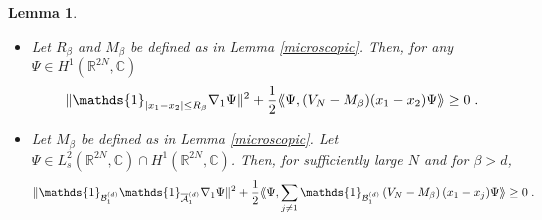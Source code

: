 \documentclass[11pt, english, american]{article}
\newcommand{\laa}{\langle\hspace{-0.08cm}\langle}
\newcommand{\raa}{\rangle\hspace{-0.08cm}\rangle}
\newtheorem{lemma}[theorem]{Lemma}
\begin{document}
\begin{lemma}\label{positiv V-w} 
$ $\\
\begin{itemize}
\item[(a)]
Let $R_\beta$ and $M_\beta$ be defined as in Lemma \ref{microscopic}.
Then, for  any $\Psi\in H^1(\mathbb{R}^{2N}, \mathbb{C})$
$$\|\mathds{1}_{|x_1-x_2|\leq  R_{\beta}}\nabla_1\Psi\|^2+\frac{1}{2}\laa\Psi,
(V_{N}-M_{\beta})(x_1-x_2)\Psi\raa\geq0\;.$$
\item[(b)] 
Let $M_\beta$ be defined as in Lemma \ref{microscopic}. 
Let  $\Psi\in
L_s^2(\mathbb{R}^{2N}, \mathbb{C}) \cap H^1(\mathbb{R}^{2N}, \mathbb{C})$.
Then, for sufficiently large $N$ and for $\beta>d$,
\begin{align*}
\|\mathds{1}_{\mathcal{B}^{(d)}_{1}}\mathds{1}_{\overline{\mathcal{A}}^{(d)}_{1}}\nabla_1\Psi \|^2
%
+
\frac{1}{2}
\laa\Psi ,\sum_{j\neq
1}\mathds{1}_{\mathcal{B}^{(d)}_{1}}\left(V_N-M_{\beta}\right)(x_1-x_j)\Psi \raa
\geq 0
\;.
\end{align*}
\end{itemize}


\end{lemma}
\end{document}
